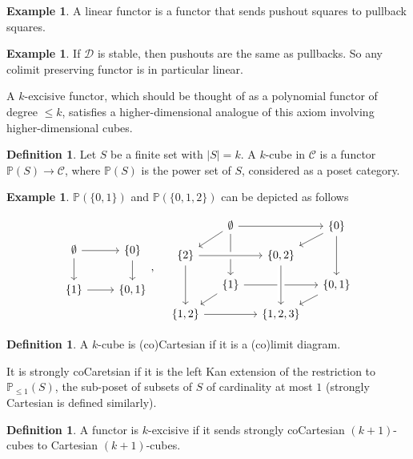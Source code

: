 \documentclass{shortart}
\theoremstyle{definition}
\newtheorem{defi}[lemma]{Definition}
\newtheorem{eg}[lemma]{Example}
\renewcommand\P{\mathbb{P}}
\begin{document}
\begin{eg}
  A linear functor is a functor that sends pushout squares to pullback squares.
\end{eg}

\begin{eg}
  If $\mathcal{D}$ is stable, then pushouts are the same as pullbacks. So any colimit preserving functor is in particular linear.
\end{eg}

A $k$-excisive functor, which should be thought of as a polynomial functor of degree $\leq k$, satisfies a higher-dimensional analogue of this axiom involving higher-dimensional cubes.
\begin{defi}
  Let $S$ be a finite set with $|S| = k$. A $k$-cube in $\mathcal{C}$ is a functor $\P(S) \to \mathcal{C}$, where $\P(S)$ is the power set of $S$, considered as a poset category.
\end{defi}

\begin{eg}
  $\P(\{0, 1\})$ and $\P(\{0, 1, 2\})$ can be depicted as follows
  \begin{useimager}
    \[
      \begin{tikzcd}
        \emptyset \ar[r] \ar[d] & \{0\} \ar[d]\\
        \{1\} \ar[r] & \{0, 1\}
      \end{tikzcd},\quad
      \begin{tikzcd}[row sep=small, column sep=small]
        & \emptyset \ar[rr] \ar[ld] \ar[dd] & & \{0\} \ar[ld] \ar[dd]\\
        \{2\} \ar[dd] \ar[rr, crossing over] & & \{0, 2\}\\
        & \{1\} \ar[ld] \ar[rr]& & \{0, 1\} \ar[ld]\\
        \{1, 2\} \ar[rr] & & \{1, 2, 3\} \ar[from=uu, crossing over]
      \end{tikzcd}
    \]
  \end{useimager}
\end{eg}

\begin{defi}
  A $k$-cube is (co)Cartesian if it is a (co)limit diagram.

  It is strongly coCaretsian if it is the left Kan extension of the restriction to $\P_{\leq 1}(S)$, the sub-poset of subsets of $S$ of cardinality at most $1$ (strongly Cartesian is defined similarly).
\end{defi}

\begin{defi}
  A functor is $k$-excisive if it sends strongly coCartesian $(k + 1)$-cubes to Cartesian $(k + 1)$-cubes.
\end{defi}
\end{document}
